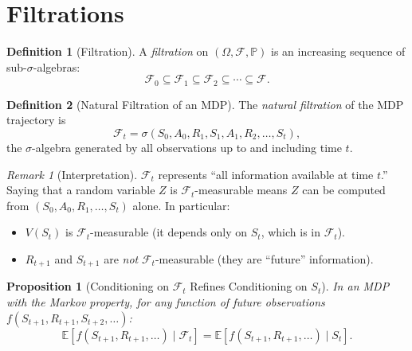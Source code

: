\documentclass[11pt,a4paper]{article}
\theoremstyle{definition}
\newtheorem{definition}{Definition}[section]
\theoremstyle{plain}
\newtheorem{proposition}[theorem]{Proposition}
\theoremstyle{remark}
\newtheorem{remark}{Remark}[section]
\newcommand{\E}{\mathbb{E}}
\newcommand{\Prob}{\mathbb{P}}
\begin{document}
\section{Filtrations}
\label{sec:filtrations}

\begin{definition}[Filtration]
\label{def:filtration}
A \emph{filtration} on $(\Omega, \mathcal{F}, \Prob)$ is an increasing sequence of sub-$\sigma$-algebras:
\begin{equation}
    \mathcal{F}_0 \subseteq \mathcal{F}_1 \subseteq \mathcal{F}_2 \subseteq \cdots \subseteq \mathcal{F}.
    \label{eq:filtration}
\end{equation}
\end{definition}

\begin{definition}[Natural Filtration of an MDP]
\label{def:mdp_filtration}
The \emph{natural filtration} of the MDP trajectory is
\begin{equation}
    \mathcal{F}_t = \sigma(S_0, A_0, R_1, S_1, A_1, R_2, \ldots, S_t),
    \label{eq:mdp_filtration}
\end{equation}
the $\sigma$-algebra generated by all observations up to and including time $t$.
\end{definition}

\begin{remark}[Interpretation]
$\mathcal{F}_t$ represents ``all information available at time $t$.'' Saying that a random variable $Z$ is $\mathcal{F}_t$-measurable means $Z$ can be computed from $(S_0, A_0, R_1, \ldots, S_t)$ alone. In particular:
\begin{itemize}[nosep]
    \item $V(S_t)$ is $\mathcal{F}_t$-measurable (it depends only on $S_t$, which is in $\mathcal{F}_t$).
    \item $R_{t+1}$ and $S_{t+1}$ are \emph{not} $\mathcal{F}_t$-measurable (they are ``future'' information).
\end{itemize}
\end{remark}

\begin{proposition}[Conditioning on $\mathcal{F}_t$ Refines Conditioning on $S_t$]
\label{prop:filtration_refine}
In an MDP with the Markov property, for any function of future observations $f(S_{t+1}, R_{t+1}, S_{t+2}, \ldots)$:
\begin{equation}
    \E[f(S_{t+1}, R_{t+1}, \ldots) \mid \mathcal{F}_t] = \E[f(S_{t+1}, R_{t+1}, \ldots) \mid S_t].
    \label{eq:markov_filtration}
\end{equation}
\end{proposition}
\end{document}
